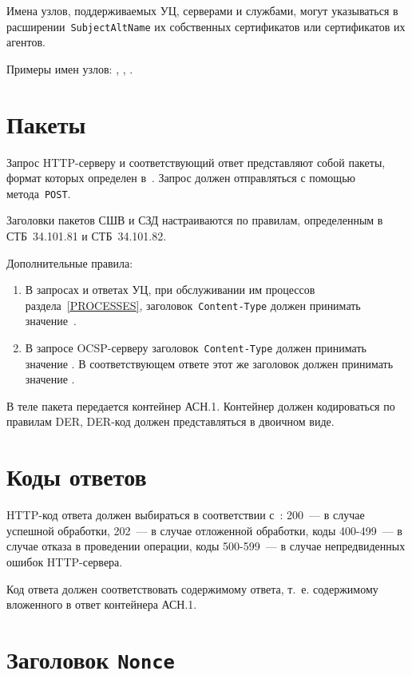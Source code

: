 Имена узлов, поддерживаемых УЦ, серверами и службами, могут указываться в 
расширении~\texttt{SubjectAltName} их собственных сертификатов или 
сертификатов их агентов. 

Примеры имен узлов: , 
, 
.

\section{Пакеты}\label{TRANSPORT.Packets}

Запрос HTTP-серверу и соответствующий ответ представляют собой пакеты,
формат которых определен в~\cite{HTTP}.
%
Запрос должен отправляться с помощью метода~\texttt{POST}.

Заголовки пакетов СШВ и СЗД настраиваются по правилам, 
определенным в СТБ~34.101.81 и СТБ~34.101.82. 

Дополнительные правила:
\begin{enumerate}
\item
В запросах и ответах УЦ, при обслуживании им процессов раздела~\ref{PROCESSES},
заголовок~\texttt{Content-Type} должен принимать значение~.

\item
В запросе OCSP-серверу заголовок~\texttt{Content-Type} 
должен принимать значение .
В соответствующем ответе этот же заголовок должен принимать значение 
. 
\end{enumerate}

В теле пакета передается контейнер АСН.1.
Контейнер должен кодироваться по правилам DER, DER-код должен 
представляться в двоичном виде.

\section{Коды ответов}\label{TRANSPORT.Codes}

HTTP-код ответа должен выбираться в соответствии с~\cite{HTTP}: 
200~--- в случае успешной обработки, 
202~--- в случае отложенной обработки,
коды 400-499~--- в случае отказа в проведении операции,
коды 500-599~--- в случае непредвиденных ошибок HTTP-сервера.

Код ответа должен соответствовать содержимому ответа, т.~е.
содержимому вложенного в ответ контейнера АСН.1.

\section{Заголовок \texttt{Nonce}}\label{TRANSPORT.Nonce}

